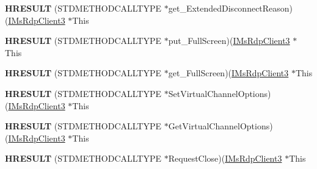 \begin{DoxyCompactItemize}
\item 
\mbox{\label{struct_m_s_t_s_c_lib_1_1_i_ms_rdp_client3_vtbl_a0535b4b2accd54903c126492ccc1d045}} 
{\bfseries H\+R\+E\+S\+U\+LT} (S\+T\+D\+M\+E\+T\+H\+O\+D\+C\+A\+L\+L\+T\+Y\+PE $\ast$get\+\_\+\+Extended\+Disconnect\+Reason)(\hyperlink{interface_m_s_t_s_c_lib_1_1_i_ms_rdp_client3}{I\+Ms\+Rdp\+Client3} $\ast$This
\item 
\mbox{\label{struct_m_s_t_s_c_lib_1_1_i_ms_rdp_client3_vtbl_a8b55f18769e184a4e10f55d2deed1524}} 
{\bfseries H\+R\+E\+S\+U\+LT} (S\+T\+D\+M\+E\+T\+H\+O\+D\+C\+A\+L\+L\+T\+Y\+PE $\ast$put\+\_\+\+Full\+Screen)(\hyperlink{interface_m_s_t_s_c_lib_1_1_i_ms_rdp_client3}{I\+Ms\+Rdp\+Client3} $\ast$This
\item 
\mbox{\label{struct_m_s_t_s_c_lib_1_1_i_ms_rdp_client3_vtbl_a074d14dc615a1c89af6870d832e54d37}} 
{\bfseries H\+R\+E\+S\+U\+LT} (S\+T\+D\+M\+E\+T\+H\+O\+D\+C\+A\+L\+L\+T\+Y\+PE $\ast$get\+\_\+\+Full\+Screen)(\hyperlink{interface_m_s_t_s_c_lib_1_1_i_ms_rdp_client3}{I\+Ms\+Rdp\+Client3} $\ast$This
\item 
\mbox{\label{struct_m_s_t_s_c_lib_1_1_i_ms_rdp_client3_vtbl_ac167ba4e90345510b5cd48cbf596e536}} 
{\bfseries H\+R\+E\+S\+U\+LT} (S\+T\+D\+M\+E\+T\+H\+O\+D\+C\+A\+L\+L\+T\+Y\+PE $\ast$Set\+Virtual\+Channel\+Options)(\hyperlink{interface_m_s_t_s_c_lib_1_1_i_ms_rdp_client3}{I\+Ms\+Rdp\+Client3} $\ast$This
\item 
\mbox{\label{struct_m_s_t_s_c_lib_1_1_i_ms_rdp_client3_vtbl_a86e277145136b25607d98152038db5d0}} 
{\bfseries H\+R\+E\+S\+U\+LT} (S\+T\+D\+M\+E\+T\+H\+O\+D\+C\+A\+L\+L\+T\+Y\+PE $\ast$Get\+Virtual\+Channel\+Options)(\hyperlink{interface_m_s_t_s_c_lib_1_1_i_ms_rdp_client3}{I\+Ms\+Rdp\+Client3} $\ast$This
\item 
\mbox{\label{struct_m_s_t_s_c_lib_1_1_i_ms_rdp_client3_vtbl_a1ec9ba8761960d2e36b468b9988853af}} 
{\bfseries H\+R\+E\+S\+U\+LT} (S\+T\+D\+M\+E\+T\+H\+O\+D\+C\+A\+L\+L\+T\+Y\+PE $\ast$Request\+Close)(\hyperlink{interface_m_s_t_s_c_lib_1_1_i_ms_rdp_client3}{I\+Ms\+Rdp\+Client3} $\ast$This

\end{DoxyCompactItemize}

